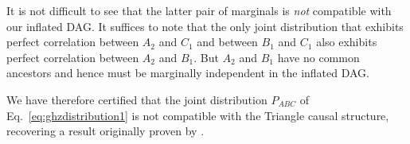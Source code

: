 It is not difficult to see that the latter pair of marginals is \emph{not} compatible with our inflated DAG. It suffices to note that the only joint distribution that exhibits perfect correlation between $A_2$ and $C_1$ and between $B_1$ and $C_1$ also exhibits perfect correlation between $A_2$ and $B_1$.  But $A_2$ and $B_1$ have no common ancestors and hence must be marginally independent in the inflated DAG.

We have therefore certified that the joint distribution $P_{A B C}$ of Eq.~\eqref{eq:ghzdistribution1} is not compatible with the Triangle causal structure, recovering a result originally proven by 
 \citet{steudel2010ancestors}.

